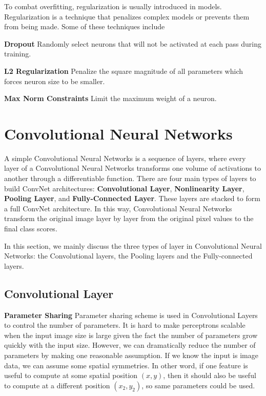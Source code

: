 \documentclass[twoside]{article}
\begin{document}
To combat overfitting, regularization is usually introduced in models. Regularization is a technique that penalizes complex models or prevents them from being made. Some of these techniques include

\textbf{Dropout}
Randomly select neurons that will not be activated at each pass during training.

\textbf{L2 Regularization}
Penalize the square magnitude of all parameters which forces neuron size to be smaller.

\textbf{Max Norm Constraints}
Limit the maximum weight of a neuron.


\section{Convolutional Neural Networks}
A simple Convolutional Neural Networks is a sequence of layers, where every layer of a Convolutional Neural Networks transforms one volume of activations to another through a differentiable function. There are four main types of layers to build ConvNet architectures: \textbf{Convolutional Layer}, \textbf{Nonlinearity Layer}, \textbf{Pooling Layer}, and \textbf{Fully-Connected Layer}. These layers are stacked to form a full ConvNet architecture. In this way, Convolutional Neural Networks transform the original image layer by layer from the original pixel values to the final class scores.

In this section, we mainly discuss the three types of layer in Convolutional Neural Networks: the Convolutional layers, the Pooling layers and the Fully-connected layers.

\subsection{Convolutional Layer}
\textbf{Parameter Sharing}
Parameter sharing scheme is used in Convolutional Layers to control the number of parameters. It is hard to make perceptrons scalable when the input image size is large given the fact the number of parameters grow quickly with the input size. However, we can dramatically reduce the number of parameters by making one reasonable assumption. If we know the input is image data, we can assume some spatial symmetries. In other word, if one feature is useful to compute at some spatial position $(x,y)$, then it should also be useful to compute at a different position $(x_2,y_2)$, so same parameters could be used.
\end{document}

